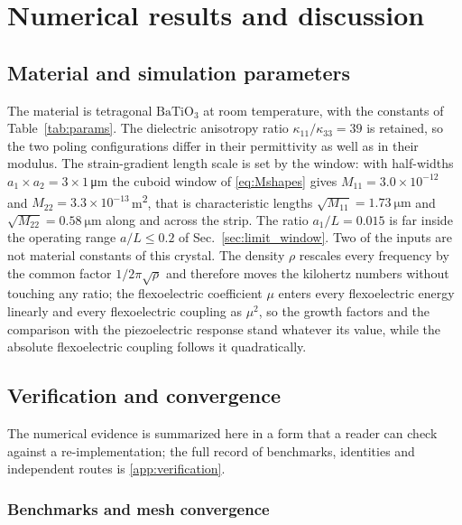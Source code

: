 \FloatBarrier
\section{Numerical results and discussion}
\label{sec:results}

\FloatBarrier
\subsection{Material and simulation parameters}
\label{sec:material}

The material is tetragonal $\mathrm{BaTiO_3}$ at room temperature, with the
constants of Table~\ref{tab:params}. The dielectric anisotropy ratio
$\kappa_{11}/\kappa_{33}=39$ is retained, so the two poling configurations
differ in their permittivity as well as in their modulus. The strain-gradient
length scale is set by the window: with half-widths
$a_1\times a_2=3\times1$\,\si{\micro\metre} the cuboid window of
\eqref{eq:Mshapes} gives $M_{11}=3.0\times10^{-12}$ and
$M_{22}=3.3\times10^{-13}$\,\si{\square\metre}, that is characteristic lengths
$\sqrt{M_{11}}=\SI{1.73}{\micro\metre}$ and
$\sqrt{M_{22}}=\SI{0.58}{\micro\metre}$ along and across the strip. The ratio
$a_1/L=0.015$ is far inside the operating range $a/L\le0.2$ of
Sec.~\ref{sec:limit_window}. Two of the inputs are not material constants of
this crystal. The density $\rho$ rescales every frequency by the common factor
$1/2\pi\sqrt{\rho}$ and therefore moves the kilohertz numbers without touching
any ratio; the flexoelectric coefficient $\mu$ enters every flexoelectric
energy linearly and every flexoelectric coupling as $\mu^{2}$, so the growth
factors and the comparison with the piezoelectric response stand whatever its
value, while the absolute flexoelectric coupling follows it quadratically.

\FloatBarrier
\subsection{Verification and convergence}
\label{sec:verification}

The numerical evidence is summarized here in a form that a reader can check
against a re-implementation; the full record of benchmarks, identities and
independent routes is \ref{app:verification}.

\subsubsection{Benchmarks and mesh convergence}

